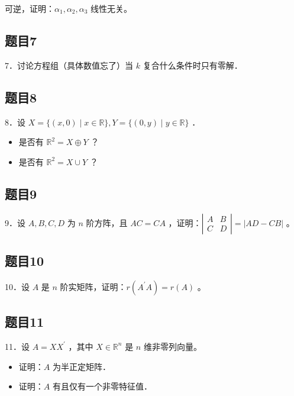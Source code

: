 \documentclass{article}
\begin{document}
可逆，证明：\(\alpha_{1}, \alpha_{2}, \alpha_{3}\) 线性无关。

\subsection{题目7}
7．讨论方程组（具体数值忘了）当 \(k\) 复合什么条件时只有零解．

\subsection{题目8}
8．设 \(X=\{(x, 0) \mid x \in \mathbb{R}\}, Y=\{(0, y) \mid y \in \mathbb{R}\}\) ．

\begin{itemize}
  \item[（1）] 是否有 \(\mathbb{R}^{2}=X \oplus Y\) ？
  \item[（2）] 是否有 \(\mathbb{R}^{2}=X \cup Y\) ？
\end{itemize}

\subsection{题目9}
9．设 \(A, B, C, D\) 为 \(n\) 阶方阵，且 \(A C=C A\) ，证明：\(\left|\begin{array}{ll}A & B \\ C & D\end{array}\right|=|A D-C B|\) 。

\subsection{题目10}
10．设 \(A\) 是 \(n\) 阶实矩阵，证明：\(r\left(A^{\prime} A\right)=r(A)\) 。

\subsection{题目11}
11．设 \(A=X X^{\prime}\) ，其中 \(X \in \mathbb{R}^{n}\) 是 \(n\) 维非零列向量。

\begin{itemize}
  \item[（1）] 证明：\(A\) 为半正定矩阵．
  \item[（2）] 证明：\(A\) 有且仅有一个非零特征值．
\end{itemize}
\end{document}
